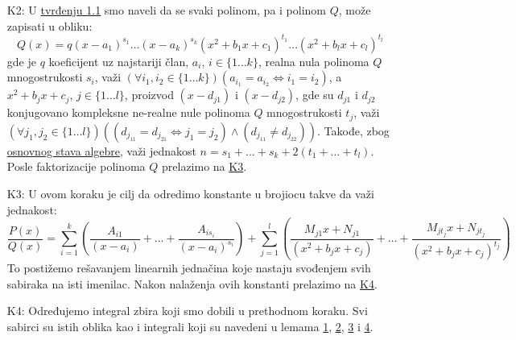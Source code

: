 \documentclass{article}
\begin{document}
\begin{algbox}
\begin{enumerate}[label=\text{K\arabic*}]
        \item[K2:]\label{Algoritam_1_K2}
              U \hyperref[tvrđenje_1.1]{tvrđenju 1.1} smo naveli da se
              svaki polinom, pa i polinom $Q$, može zapisati u obliku:
              $$Q(x) = q(x - a_1)^{s_1}\dotsc(x-a_k)^{s_k}(x^2 + b_1x + c_1)^{t_1}\dotsc(x^2 + b_lx + c_l)^{t_l}$$
              gde je $q$ koeficijent uz najstariji član,
              $a_i$, $i\in\{1\dotsc k\}$, realna nula polinoma $Q$ mnogostrukosti $s_i$, važi $(\forall i_1,i_2\in\{1\dotsc k\})(a_{i_1}=a_{i_2}\iff i_1=i_2)$,
              a $x^2+b_jx+c_j$, $j\in\{1\dotsc l\}$,
              proizvod $(x-d_{j1})$ i $(x-d_{j2})$,
              gde su $d_{j1}$ i $d_{j2}$ konjugovano kompleksne ne-realne nule polinoma $Q$
              mnogostrukosti $t_j$, važi $(\forall j_1,j_2\in\{1\dotsc l\})((d_{j_11}=d_{j_21}\iff j_1=j_2)\land(d_{j_11}\neq d_{j_22}))$.
              Takođe, zbog \hyperref[OSA]{osnovnog stava algebre}, važi jednakost $n=s_1+\dotsc+s_k+2(t_1+\dotsc+t_l)$.
              Posle faktorizacije polinoma $Q$ prelazimo na \hyperref[Algoritam_1_K3]{K3}.
        \item[K3:]\label{Algoritam_1_K3}
              U ovom koraku je cilj da odredimo konstante u brojiocu takve da važi jednakost:
              $$\frac{P(x)}{Q(x)}=\sum_{i = 1}^k(\frac{A_{i1}}{(x-a_i)}+\dotsc+\frac{A_{is_i}}{(x-a_i)^{s_i}}) + \sum_{j = 1}^l( \frac{M_{j1}x + N_{j1}}{(x^2+b_jx+c_j)}+\dotsc+\frac{M_{jt_j}x + N_{jt_j}}{(x^2 + b_jx + c_j)^{t_j}})$$
              To postižemo rešavanjem linearnih jednačina koje
              nastaju svođenjem svih sabiraka na isti imenilac.
              Nakon nalaženja ovih konstanti prelazimo na \hyperref[Algoritam_1_K4]{K4}.
        \item[K4:]\label{Algoritam_1_K4}
              Određujemo integral zbira koji smo dobili u prethodnom koraku.
              Svi sabirci su istih oblika kao i integrali koji su navedeni u lemama
              \hyperref[lema_1.1.1]{1}, \hyperref[lema_1.1.2]{2}, \hyperref[lema_1.1.3]{3} i \hyperref[lema_1.1.4]{4}.

    \end{enumerate}
\end{algbox}
\end{document}
